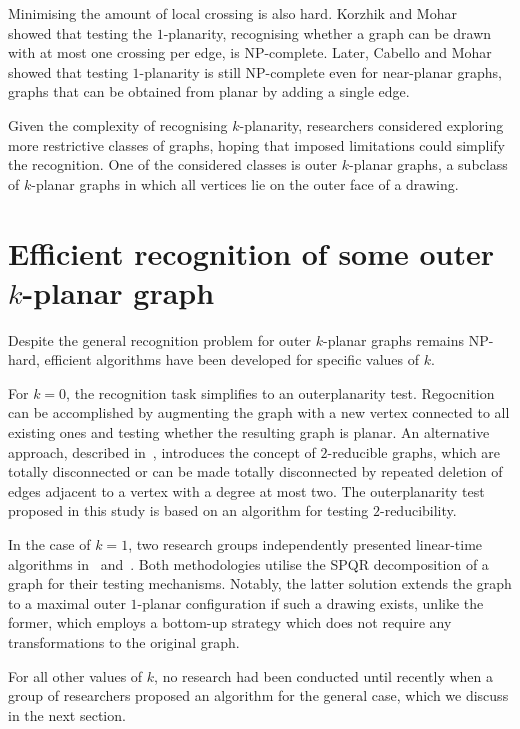 Minimising the amount of local crossing is also hard. Korzhik and Mohar~\cite{1p-NPH} showed that testing the \(1\)-planarity, recognising whether a graph can be drawn with at most one crossing per edge, is NP-complete. Later, Cabello and Mohar~\cite{one-edge-NPH} showed that testing \(1\)-planarity is still NP-complete even for near-planar graphs, graphs that can be obtained from planar by adding a single edge.

Given the complexity of recognising \(k\)-planarity, researchers considered exploring more restrictive classes of graphs, hoping that imposed limitations could simplify the recognition. One of the considered classes is outer \(k\)-planar graphs, a subclass of \(k\)-planar graphs in which all vertices lie on the outer face of a drawing.

\section{Efficient recognition of some outer \(k\)-planar graph}\label{sec:efficient-recognition-of-some-outer-(k)-planar-graph}

Despite the general recognition problem for outer \(k\)-planar graphs remains NP-hard, efficient algorithms have been developed for specific values of \(k\).

For \(k = 0\), the recognition task simplifies to an outerplanarity test. Regocnition can be accomplished by augmenting the graph with a new vertex connected to all existing ones and testing whether the resulting graph is planar. An alternative approach, described in~\cite{linear-op}, introduces the concept of \(2\)-reducible graphs, which are totally disconnected or can be made totally disconnected by repeated deletion of edges adjacent to a vertex with a degree at most two. The outerplanarity test proposed in this study is based on an algorithm for testing \(2\)-reducibility.

In the case of \(k = 1\), two research groups independently presented linear-time algorithms in~\cite{linear-o1p} and~\cite{linear-o1p_}. Both methodologies utilise the SPQR decomposition of a graph for their testing mechanisms. Notably, the latter solution extends the graph to a maximal outer \(1\)-planar configuration if such a drawing exists, unlike the former, which employs a bottom-up strategy which does not require any transformations to the original graph.

For all other values of \(k\), no research had been conducted until recently when a group of researchers proposed an algorithm for the general case, which we discuss in the next section.

